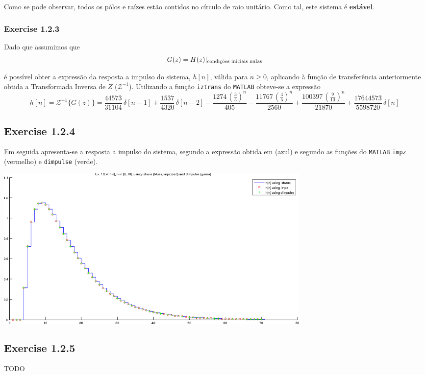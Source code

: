 \documentclass[a4paper]{article}
\begin{document}
\noindent Como se pode observar, todos os pólos e raízes estão contidos no círculo de raio unitário. Como tal, este sistema é \textbf{estável}.

\subsubsection{Exercise 1.2.3}
\label{subsubsec:ex1_2_3}
\noindent Dado que assumimos que
\begin{equation}
	G(z) = H(z)|_{\text{condições iniciais nulas}} \\
\end{equation}

\noindent é possível obter a expressão da resposta a impulso do sistema, $h[n]$, válida para $n \ge 0$, aplicando à função de transferência anteriormente obtida a Transformada Inversa de $Z$ ($\mathcal{Z}^{-1}$). Utilizando a função \texttt{iztrans} do \texttt{MATLAB} obteve-se a expressão
\begin{equation}
	h[n] = \mathcal{Z}^{-1}\{G(z)\} = \frac{44573}{31104} \, \delta[n - 1] + \frac{1537}{4320} \, \delta[n - 2] - \frac{1274 \, (\frac{3}{5}) ^ n}{405} - \frac{11767 \, (\frac{4}{5}) ^ n}{2560} + \frac{100397 \, (\frac{9}{10}) ^ n}{21870} + \frac{17644573}{5598720} \, \delta[n]
\end{equation}

\subsection{Exercise 1.2.4}
\noindent Em seguida apresenta-se a resposta a impulso do sistema, segundo a expressão obtida em \emph{} (azul) e segundo as funções do \texttt{MATLAB} \texttt{impz} (vermelho) e \texttt{dimpulse} (verde).

\begin{center}
	\includegraphics[width=0.70\textwidth]{images/ex1_2_4.png}
	\label{fig:ex1_2_4_zplane}
\end{center}

\subsection{Exercise 1.2.5}
TODO
\end{document}
